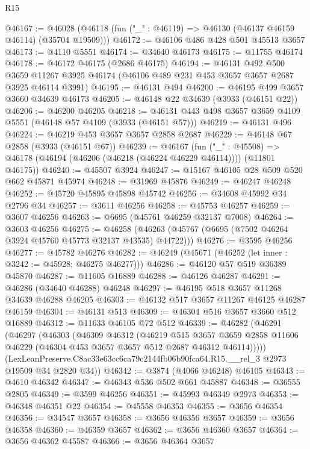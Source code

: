 \begin{lexlean}{R15}
\begin{coremodule}
@46167 := @46028 (@46118 (fun ("_" : @46119) => @46130 (@46137 @46159 @46114) (@35704 @19509)))
@46172 := @46106 @486 @428 @501 @45513 @3657
@46173 := @4110 @5551
@46174 := @34640 @46173
@46175 := @11755 @46174
@46178 := @46172 @46175 (@2686 @46175)
@46194 := @46131
    @492
    @500
    @3659
    @11267
    @3925
    @46174
    (@46106 @489 @231 @453 @3657 @3657 @2687 @3925 @46114 @3991)
@46195 := @46131 @494
@46200 := @46195 @499 @3657 @3660 @34639 @46173
@46205 := @46148 @22 @34639 (@3933 (@46151 @22))
@46206 := @46200 @46205
@46218 := @46131 @443 @498 @3657 @3659 @4109 @5551 (@46148 @57 @4109 (@3933 (@46151 @57)))
@46219 := @46131 @496
@46224 := @46219 @453 @3657 @3657 @2858 @2687
@46229 := @46148 @67 @2858 (@3933 (@46151 @67))
@46239 := @46167
    (fun ("_" : @45508) => @46178 (@46194 (@46206 (@46218 (@46224 @46229 @46114)))) (@11801 @46175))
@46240 := @45507 @3924
@46247 := @15167 @46105 @28 @509 @520 @662 @45871 @45974
@46248 := @31969 @45876
@46249 := @46247 @46248
@46252 := @45720 @45895 @45898 @45742
@46256 := @34608 @45992 @34 @2796 @34
@46257 := @3611 @46256
@46258 := @45753 @46257
@46259 := @3607 @46256
@46263 := @6695 (@45761 @46259 @32137 @7008)
@46264 := @3603 @46256
@46275 := @46258 (@46263 (@45767 (@6695 (@7502 @46264 @3924 @45760 @45773 @32137 @43535) @44722)))
@46276 := @3595 @46256
@46277 := @45782 @46276
@46282 := @46249 (@45671 (@46252 (let inner : @3242 := @45928; @46275 @46277)))
@46286 := @46120 @57 @519 @36389 @45870
@46287 := @11605 @16889
@46288 := @46126 @46287
@46291 := @46286 (@34640 @46288) @46248
@46297 := @46195 @518 @3657 @11268 @34639 @46288 @46205
@46303 := @46132 @517 @3657 @11267 @46125 @46287 @46159
@46304 := @46131 @513
@46309 := @46304 @516 @3657 @3660 @512 @16889
@46312 := @11633 @46105 @72 @512
@46339 := @46282
    (@46291
      (@46297
        (@46303
          (@46309
            @46312
            (@46219
              @515
              @3657
              @3659
              @2858
              @11606
              @46229
              (@46304 @453 @3657 @3657 @512 @2687 @46312 @46114)))))
      (LexLeanPreserve.C8ac33e63cc6ca79c2144fb06b90fca64.R15.__rel_3 @2973 @19509 @34 @2820 @34))
@46342 := @3874 (@4066 @46248) @46105
@46343 := @4610 @46342
@46347 := @46343 @536 @502 @661 @45887
@46348 := @36555 @2805
@46349 := @3599 @46256
@46351 := @45993 @46349 @2973
@46353 := @46348 @46351 @22
@46354 := @45558 @46353
@46355 := @3656 @46354
@46356 := @34547 @3657
@46358 := @3656 @46356 @3657
@46359 := @3656 @46358
@46360 := @46359 @3657
@46362 := @3656 @46360 @3657
@46364 := @3656 @46362 @45587
@46366 := @3656 @46364 @3657

\end{coremodule}
\end{lexlean}
